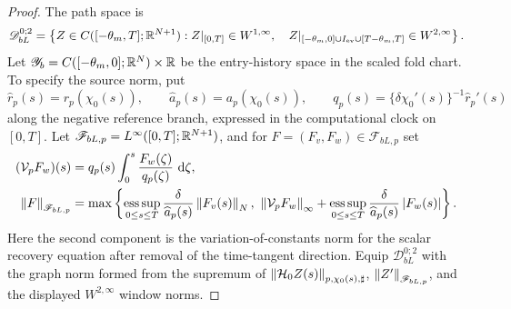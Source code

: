 \begin{proof}
The path space is
\begin{equation}
 \mathscr D_{bL}^{0;2}
 =\left\{Z\in C([ -\theta_m,T];\mathbb R^{N+1}):
 Z|_{[0,T]}\in W^{1,\infty},\quad
 Z|_{[-\theta_m,0]\cup I_{\rm ev}\cup[T-\theta_m,T]}
       \in W^{2,\infty}\right\}.
 \label{eq:supp-mixed-path-space}
\end{equation}
Let \(\mathscr Y_b=C([ -\theta_m,0];\mathbb R^N)\times\mathbb R\) be the entry-history
space in the scaled fold chart.  To specify the source norm, put
\[
 \widehat r_p(s)=r_p(\chi_0(s)),\qquad
 \widehat a_p(s)=a_p(\chi_0(s)),\qquad
 q_p(s)=\{\delta\chi_0'(s)\}^{-1}\widehat r_p'(s)
\]
along the negative reference branch, expressed in the computational clock on
\([0,T]\).  Let
\(\mathscr F_{bL,p}=L^\infty([0,T];\mathbb R^{N+1})\), and for
\(F=(F_v,F_w)\in\mathscr F_{bL,p}\) set
\begin{align}
 (\mathcal V_pF_w)(s)
 &=q_p(s)\int_0^s\frac{F_w(\zeta)}{q_p(\zeta)}\,\,\mathrm d\zeta,\notag\\
 \left\lVert F\right\rVert_{\mathscr F_{bL,p}}
 &=\max\left\{
   \operatorname*{ess\,sup}_{0\le s\le T}
        \frac{\delta}{\widehat a_p(s)}\left\lVert F_v(s)\right\rVert_N,\
   \left\lVert\mathcal V_pF_w\right\rVert_\infty
   +\operatorname*{ess\,sup}_{0\le s\le T}
        \frac{\delta}{\widehat a_p(s)}\left\lvert F_w(s)\right\rvert\right\}.
 \label{eq:supp-mixed-source-norm}
\end{align}
Here the second component is the variation-of-constants norm for the scalar
recovery equation after removal of the time-tangent direction.  Equip
\(\mathscr D_{bL}^{0;2}\) with the graph norm formed from the supremum of
\(\left\lVert\mathcal H_0Z(s)\right\rVert_{p,\chi_0(s),\sharp}\),
\(\left\lVert Z'\right\rVert_{\mathscr F_{bL,p}}\), and the displayed
\(W^{2,\infty}\) window norms.


\end{proof}
